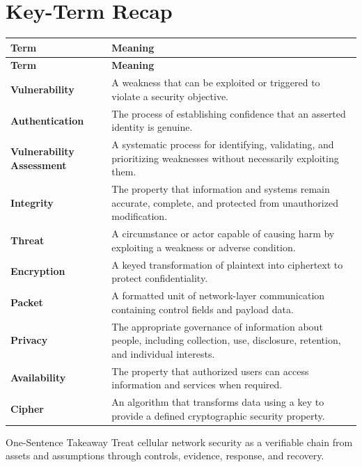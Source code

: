 \documentclass[11pt,letterpaper]{article}
\begin{document}
\section*{Key-Term Recap}
\begin{longtable}{>{\raggedright\arraybackslash}p{}>{\raggedright\arraybackslash}p{}}
\toprule\rowcolor{Navy}\color{white}\textbf{Term} & \color{white}\textbf{Meaning}\\\midrule
\endfirsthead
\toprule\rowcolor{Navy}\color{white}\textbf{Term} & \color{white}\textbf{Meaning}\\\midrule
\endhead
\textbf{Vulnerability} & A weakness that can be exploited or triggered to violate a security objective. \\\midrule
\textbf{Authentication} & The process of establishing confidence that an asserted identity is genuine. \\\midrule
\textbf{Vulnerability Assessment} & A systematic process for identifying, validating, and prioritizing weaknesses without necessarily exploiting them. \\\midrule
\textbf{Integrity} & The property that information and systems remain accurate, complete, and protected from unauthorized modification. \\\midrule
\textbf{Threat} & A circumstance or actor capable of causing harm by exploiting a weakness or adverse condition. \\\midrule
\textbf{Encryption} & A keyed transformation of plaintext into ciphertext to protect confidentiality. \\\midrule
\textbf{Packet} & A formatted unit of network-layer communication containing control fields and payload data. \\\midrule
\textbf{Privacy} & The appropriate governance of information about people, including collection, use, disclosure, retention, and individual interests. \\\midrule
\textbf{Availability} & The property that authorized users can access information and services when required. \\\midrule
\textbf{Cipher} & An algorithm that transforms data using a key to provide a defined cryptographic security property. \\\midrule
\bottomrule
\end{longtable}
\begin{CornellExamBox}{One-Sentence Takeaway}
Treat cellular network security as a verifiable chain from assets and assumptions through controls, evidence, response, and recovery.
\end{CornellExamBox}
\end{document}
